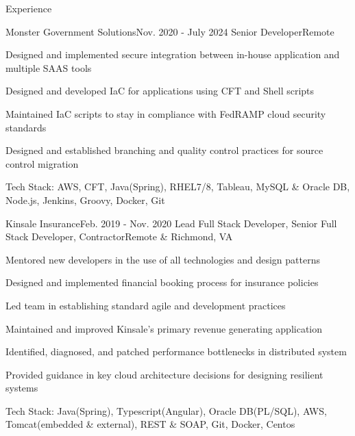 \documentclass{resume} %
\begin{document}

\begin{rSection}{\vspace{-1em}Experience}

	\begin{rSubsection}{Monster Government Solutions}{Nov. 2020 - July 2024}
			{Senior Developer}{Remote}
		\item Designed and implemented secure integration between in-house application and multiple SAAS tools
		\item Designed and developed IaC for applications using CFT and Shell scripts
		\item Maintained IaC scripts to stay in compliance with FedRAMP cloud security standards
		\item Designed and established branching and quality control practices for source control migration
		\item Tech Stack: AWS, CFT, Java(Spring), RHEL7/8, Tableau, MySQL \& Oracle DB, Node.js, Jenkins, Groovy, Docker, Git
	\end{rSubsection}\vspace{-0.5em}
	
	\begin{rSubsection}{Kinsale Insurance}{Feb. 2019 - Nov. 2020}
			{Lead Full Stack Developer, Senior Full Stack Developer, Contractor}{Remote \& Richmond, VA}
		\item Mentored new developers in the use of all technologies and design patterns
		\item Designed and implemented financial booking process for insurance policies
		\item Led team in establishing standard agile and development practices
	    \item Maintained and improved Kinsale's primary revenue generating application
		\item Identified, diagnosed, and patched performance bottlenecks in distributed system
		\item Provided guidance in key cloud architecture decisions for designing resilient systems
		\item Tech Stack: Java(Spring), Typescript(Angular), Oracle DB(PL/SQL), AWS, Tomcat(embedded \& external), REST \& SOAP, Git, Docker, Centos
	\end{rSubsection}\vspace{-0.5em}



\end{rSection}
\end{document}
